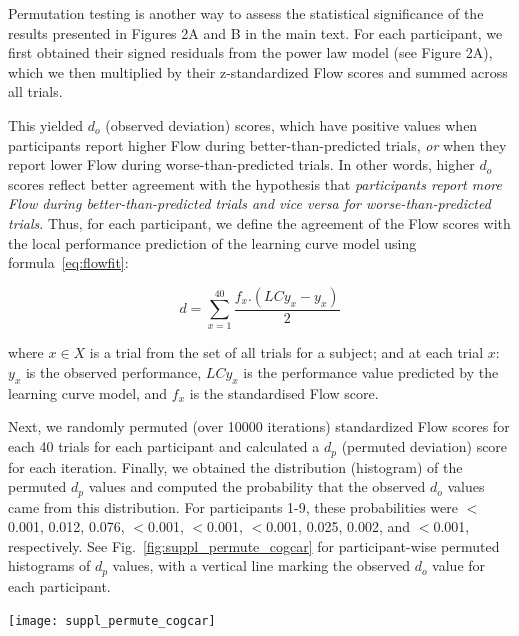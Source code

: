 \documentclass[a4paper,doc,floatsintext,natbib,10pt]{apa6}
\begin{document}
Permutation testing is another way to assess the statistical significance of the results presented in Figures 2A and B in the main text. For each participant, we first obtained their signed residuals from the power law model (see Figure 2A), which we then multiplied by their z-standardized Flow scores and summed across all trials.

This yielded $d_o$ (observed deviation) scores, which have positive values when participants report higher Flow during better-than-predicted trials, {\it or} when they report lower Flow during worse-than-predicted trials. In other words, higher $d_o$ scores reflect better agreement with the hypothesis that {\it participants report more Flow during better-than-predicted trials and vice versa for worse-than-predicted trials}. Thus, for each participant, we define the agreement of the Flow scores with the local performance prediction of the learning curve model using formula~\ref{eq:flowfit}:

\begin{equation}
	\label{eq:flowfit}
	d = \sum_{x=1}^{40} \frac{f_x.(LCy_x - y_x)}{2}
\end{equation}

where $x\in X$ is a trial from the set of all trials for a subject; and at each trial $x$: $y_x$ is the observed performance, $LCy_x$ is the performance value predicted by the learning curve model, and $f_x$ is the standardised Flow score.

Next, we randomly permuted (over 10000 iterations) standardized Flow scores for each 40 trials for each participant and calculated a $d_p$ (permuted deviation) score for each iteration. Finally, we obtained the distribution (histogram) of the permuted $d_p$ values and computed the probability that the observed $d_o$ values came from this distribution. For participants 1-9, these probabilities were $<$0.001, 0.012, 0.076, $<$0.001, $<$0.001, $<$0.001, 0.025, 0.002, and $<$0.001, respectively. See Fig.~\ref{fig:suppl_permute_cogcar} for participant-wise permuted histograms of $d_p$ values, with a vertical line marking the observed $d_o$ value for each participant.

\begin{minipage}{\textwidth}
\centering
\texttt{[image: suppl\_permute\_cogcar]}
\label{fig:suppl_permute_cogcar}
\end{minipage}
\end{document}
